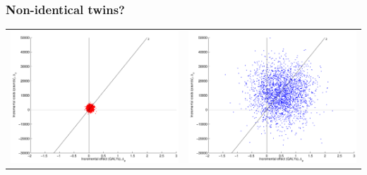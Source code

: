 \begin{frame}
\frametitle{Non-identical twins?}
\begin{tabular}{p{5.8cm}p{5.8cm}}
    \begin{minipage}[l]{5.5cm}
   \hspace{-20pt} \includegraphics[scale=.35]{6.probabilistic-sensitivity-analysis/figs/ceacLimit1}
    \end{minipage} &
    \begin{minipage}[r]{5.5cm}
    \hspace{-10pt}\includegraphics[scale=.35]{6.probabilistic-sensitivity-analysis/figs/ceacLimit2}

\end{minipage}
\end{tabular}
\end{frame}
